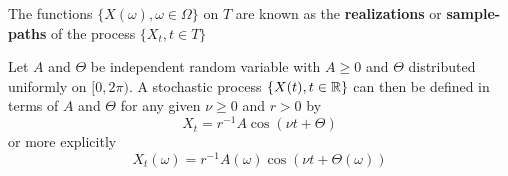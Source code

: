 \documentclass[11pt]{article}
\begin{document}
\begin{definition}
The functions \(\{X(\omega),\omega\in\Omega\}\) on \(T\) are known as the
\textbf{realizations} or \textbf{sample-paths} of the process \(\{X_t,t\in T\}\)
\end{definition}

\begin{examplle}
Let \(A\) and \(\Theta\) be independent random variable with \(A\ge0\) and \(\Theta\) distributed
uniformly on \([0,2\pi)\). A stochastic process \(\{X(t),t\in\mathbb{R}\}\) can then be
defined in terms of \(A\) and \(\Theta\) for any given \(\nu\ge0\) and \(r>0\) by
\begin{equation*}
X_t=r^{-1}A\cos(\nu t+\Theta)
\end{equation*}
or more explicitly
\begin{equation*}
X_t(\omega)=r^{-1}A(\omega)\cos(\nu t+\Theta(\omega))
\end{equation*}
\end{examplle}
\end{document}
